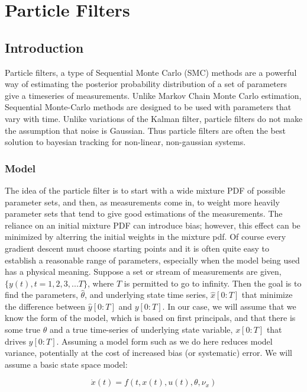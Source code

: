 \chapter{Particle Filters}
\label{sec:Particle Filter}
\section{Introduction}
Particle filters, a type of Sequential Monte Carlo (SMC) methods
are a powerful way of estimating the posterior probability distribution
of a set of parameters give a timeseries of measurements. Unlike Markov 
Chain Monte Carlo estimation, Sequential Monte-Carlo methods are designed
to be used with parameters that vary with time. Unlike variations of the
Kalman filter, particle filters do not make the assumption that noise
is Gaussian. Thus particle filters are often the best solution to bayesian 
tracking for non-linear, non-gaussian systems. 

\subsection{Model}
\label{sec:Particle Filter Model}
The idea of the particle
filter is to start with a wide mixture PDF of possible parameter sets, 
and then, as measurements come in, to weight more heavily parameter sets 
that tend to give good estimations of the measurements. The reliance on
an initial mixture PDF can introduce bias; however, this effect can be
minimized by alterring the initial weights in the mixture pdf. Of course
every gradient descent must choose starting points and it is often quite
easy to establish a reasonable range of parameters, especially when the
model being used has a physical meaning. Suppose a set or stream of measurements
are given, $\{y(t), t = 1, 2, 3, ... T\}$, where $T$ is permitted to go
 to infinity. Then the goal is to find the 
parameters, $\hat{\theta}$, and underlying state time series, $\hat{x}[0:T]$
that minimize the difference between $\hat{y}[0:T]$
and $y[0:T]$. In our case, we will assume that we know the form
of the model, which is based on first principals, and that
there is some true $\theta$ and a true time-series of underlying
state variable, $x[0:T]$ that drives $y[0:T]$. Assuming a model form 
such as we do here reduces model variance, potentially at the cost of increased
bias (or systematic) error. We will assume a basic state space model:

\begin{equation}
\dot{x}(t) = f(t, x(t), u(t), \theta, \nu_x)
\end{equation}

